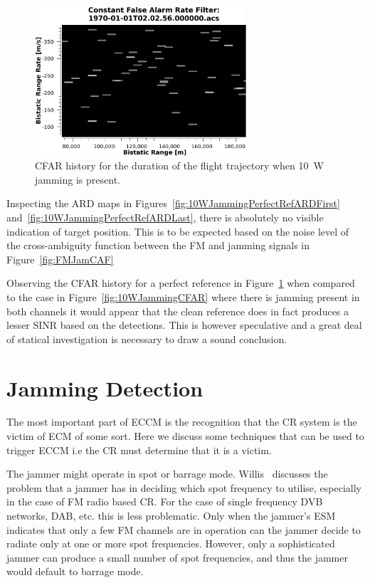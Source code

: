 \documentclass[english, 12pt]{report}
\begin{document}
\begin{figure}[htbp]
\begin{center}
\includegraphics[width=0.7\textwidth]{figs/Simulations/10WJammingPerfectRefCFAR.pdf}
\caption{CFAR history for the duration of the flight trajectory when 10~W jamming is present.}
\label{fig:10WJammingPerfectRefCFAR}
\end{center}
\end{figure}

Inspecting the ARD maps in Figures~\ref{fig:10WJammingPerfectRefARDFirst} and~\ref{fig:10WJammingPerfectRefARDLast}, there is absolutely no visible indication of target position. This is to be expected based on the noise level of the cross-ambiguity function between the FM and jamming signals in Figure~\ref{fig:FMJamCAF}

Observing the CFAR history for a perfect reference in Figure~\ref{fig:10WJammingPerfectRefCFAR} when compared to the case in Figure~\ref{fig:10WJammingCFAR} where there is jamming present in both channels it would appear that the clean reference does in fact produces a lesser SINR based on the detections. This is however speculative and a great deal of statical investigation is necessary to draw a sound conclusion.

\clearpage

\section{Jamming Detection}

The most important part of ECCM is the recognition that the CR system is the victim of ECM of some sort. Here we discuss some techniques that can be used to trigger ECCM i.e the CR must determine that it is a victim.

The jammer might operate in spot or barrage mode. Willis~\cite{willis:07}  discusses the problem that a jammer has in deciding which spot frequency to utilise, especially in the case of FM radio based CR. For the case of single frequency DVB networks, DAB, etc. this is less problematic. Only when the jammer's ESM indicates that only a few FM channels are in operation can the jammer decide to radiate only at one or more spot frequencies. However, only a sophisticated jammer can produce a small number of spot frequencies, and thus the jammer would default to barrage mode.
\end{document}
